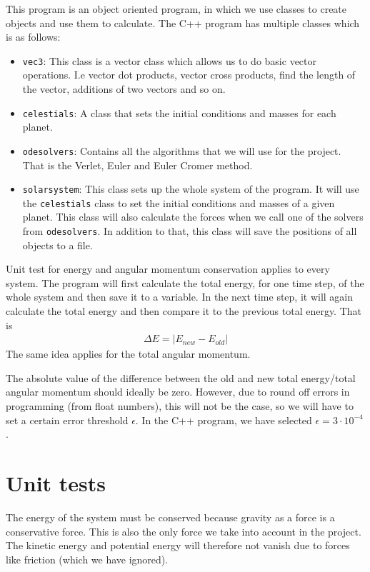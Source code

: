 \documentclass[12pt]{article}
\begin{document}
This program is an object oriented program, in which we use classes to create objects and use them to calculate. The C++ program has multiple classes which is as follows:
\begin{itemize}
\item \texttt{vec3}: This class is a vector class which allows us to do basic vector operations. I.e vector dot products, vector cross products, find the length of the vector, additions of two vectors and so on.
\item \texttt{celestials}: A class that sets the initial conditions and masses for each planet. 
\item \texttt{odesolvers}: Contains all the algorithms that we will use for the project. That is the Verlet, Euler and Euler Cromer method.
\item \texttt{solarsystem}: This class sets up the whole system of the program. It will use the \texttt{celestials} class to set the initial conditions and masses of a given planet. This class will also calculate the forces when we call one of the solvers from \texttt{odesolvers}. In addition to that, this class will save the positions of all objects to a file.
\end{itemize}

Unit test for energy and angular momentum conservation applies to every system. The program will first calculate the total energy, for one time step, of the whole system and then save it to a variable. In the next time step, it will again calculate the total energy and then compare it to the previous total energy. That is
\begin{align*}
\Delta E = |E_{new} - E_{old}|
\end{align*}
The same idea applies for the total angular momentum.

The absolute value of the difference between the old and new total energy/total angular momentum should ideally be zero. However, due to round off errors in programming (from float numbers), this will not be the case, so we will have to set a certain error threshold $\epsilon$. In the C++ program, we have selected $\epsilon = 3\cdot10^{-4}$.

\section*{Unit tests}
The energy of the system must be conserved because gravity as a force is a conservative force. This is also the only force we take into account in the project. The kinetic energy and potential energy will therefore not vanish due to forces like friction (which we have ignored).
\end{document}
